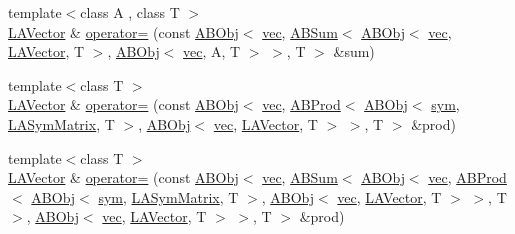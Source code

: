 \begin{DoxyCompactItemize}
\item 
{\footnotesize template$<$class A , class T $>$ }\\\mbox{\hyperlink{classROOT_1_1Minuit2_1_1LAVector}{L\+A\+Vector}} \& \mbox{\hyperlink{classROOT_1_1Minuit2_1_1LAVector_aa0b9243a861edc8aec8b958287fbb804}{operator=}} (const \mbox{\hyperlink{classROOT_1_1Minuit2_1_1ABObj}{A\+B\+Obj}}$<$ \mbox{\hyperlink{classROOT_1_1Minuit2_1_1vec}{vec}}, \mbox{\hyperlink{classROOT_1_1Minuit2_1_1ABSum}{A\+B\+Sum}}$<$ \mbox{\hyperlink{classROOT_1_1Minuit2_1_1ABObj}{A\+B\+Obj}}$<$ \mbox{\hyperlink{classROOT_1_1Minuit2_1_1vec}{vec}}, \mbox{\hyperlink{classROOT_1_1Minuit2_1_1LAVector}{L\+A\+Vector}}, T $>$, \mbox{\hyperlink{classROOT_1_1Minuit2_1_1ABObj}{A\+B\+Obj}}$<$ \mbox{\hyperlink{classROOT_1_1Minuit2_1_1vec}{vec}}, A, T $>$ $>$, T $>$ \&sum)
\item 
{\footnotesize template$<$class T $>$ }\\\mbox{\hyperlink{classROOT_1_1Minuit2_1_1LAVector}{L\+A\+Vector}} \& \mbox{\hyperlink{classROOT_1_1Minuit2_1_1LAVector_a100191791ee9f4884469efa6d779f6ec}{operator=}} (const \mbox{\hyperlink{classROOT_1_1Minuit2_1_1ABObj}{A\+B\+Obj}}$<$ \mbox{\hyperlink{classROOT_1_1Minuit2_1_1vec}{vec}}, \mbox{\hyperlink{classROOT_1_1Minuit2_1_1ABProd}{A\+B\+Prod}}$<$ \mbox{\hyperlink{classROOT_1_1Minuit2_1_1ABObj}{A\+B\+Obj}}$<$ \mbox{\hyperlink{classROOT_1_1Minuit2_1_1sym}{sym}}, \mbox{\hyperlink{classROOT_1_1Minuit2_1_1LASymMatrix}{L\+A\+Sym\+Matrix}}, T $>$, \mbox{\hyperlink{classROOT_1_1Minuit2_1_1ABObj}{A\+B\+Obj}}$<$ \mbox{\hyperlink{classROOT_1_1Minuit2_1_1vec}{vec}}, \mbox{\hyperlink{classROOT_1_1Minuit2_1_1LAVector}{L\+A\+Vector}}, T $>$ $>$, T $>$ \&prod)
\item 
{\footnotesize template$<$class T $>$ }\\\mbox{\hyperlink{classROOT_1_1Minuit2_1_1LAVector}{L\+A\+Vector}} \& \mbox{\hyperlink{classROOT_1_1Minuit2_1_1LAVector_a7292b95daebb260c1b3c7c356bf72268}{operator=}} (const \mbox{\hyperlink{classROOT_1_1Minuit2_1_1ABObj}{A\+B\+Obj}}$<$ \mbox{\hyperlink{classROOT_1_1Minuit2_1_1vec}{vec}}, \mbox{\hyperlink{classROOT_1_1Minuit2_1_1ABSum}{A\+B\+Sum}}$<$ \mbox{\hyperlink{classROOT_1_1Minuit2_1_1ABObj}{A\+B\+Obj}}$<$ \mbox{\hyperlink{classROOT_1_1Minuit2_1_1vec}{vec}}, \mbox{\hyperlink{classROOT_1_1Minuit2_1_1ABProd}{A\+B\+Prod}}$<$ \mbox{\hyperlink{classROOT_1_1Minuit2_1_1ABObj}{A\+B\+Obj}}$<$ \mbox{\hyperlink{classROOT_1_1Minuit2_1_1sym}{sym}}, \mbox{\hyperlink{classROOT_1_1Minuit2_1_1LASymMatrix}{L\+A\+Sym\+Matrix}}, T $>$, \mbox{\hyperlink{classROOT_1_1Minuit2_1_1ABObj}{A\+B\+Obj}}$<$ \mbox{\hyperlink{classROOT_1_1Minuit2_1_1vec}{vec}}, \mbox{\hyperlink{classROOT_1_1Minuit2_1_1LAVector}{L\+A\+Vector}}, T $>$ $>$, T $>$, \mbox{\hyperlink{classROOT_1_1Minuit2_1_1ABObj}{A\+B\+Obj}}$<$ \mbox{\hyperlink{classROOT_1_1Minuit2_1_1vec}{vec}}, \mbox{\hyperlink{classROOT_1_1Minuit2_1_1LAVector}{L\+A\+Vector}}, T $>$ $>$, T $>$ \&prod)

\end{DoxyCompactItemize}
